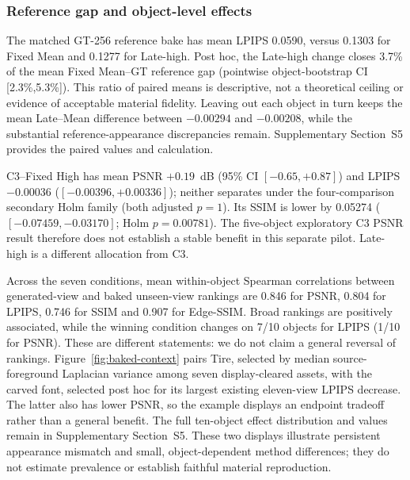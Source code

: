 \documentclass[times,twocolumn,final]{elsarticle}
\begin{document}
\subsubsection{Reference gap and object-level effects}
The matched GT-256 reference bake has mean LPIPS 0.0590, versus 0.1303 for Fixed Mean and 0.1277 for Late-high. Post hoc, the Late-high change closes 3.7\% of the mean Fixed Mean--GT reference gap (pointwise object-bootstrap CI [2.3\%,5.3\%]). This ratio of paired means is descriptive, not a theoretical ceiling or evidence of acceptable material fidelity. Leaving out each object in turn keeps the mean Late--Mean difference between $-0.00294$ and $-0.00208$, while the substantial reference-appearance discrepancies remain. Supplementary Section~S5 provides the paired values and calculation.

C3--Fixed High has mean PSNR $+0.19$~dB (95\% CI $[-0.65,+0.87]$) and LPIPS $-0.00036$ ($[-0.00396,+0.00336]$); neither separates under the four-comparison secondary Holm family (both adjusted $p=1$). Its SSIM is lower by 0.05274 ($[-0.07459,-0.03170]$; Holm $p=0.00781$). The five-object exploratory C3 PSNR result therefore does not establish a stable benefit in this separate pilot. Late-high is a different allocation from C3.

Across the seven conditions, mean within-object Spearman correlations between generated-view and baked unseen-view rankings are 0.846 for PSNR, 0.804 for LPIPS, 0.746 for SSIM and 0.907 for Edge-SSIM. Broad rankings are positively associated, while the winning condition changes on 7/10 objects for LPIPS (1/10 for PSNR). These are different statements: we do not claim a general reversal of rankings. Figure~\ref{fig:baked-context} pairs Tire, selected by median source-foreground Laplacian variance among seven display-cleared assets, with the carved font, selected post hoc for its largest existing eleven-view LPIPS decrease. The latter also has lower PSNR, so the example displays an endpoint tradeoff rather than a general benefit. The full ten-object effect distribution and values remain in Supplementary Section~S5. These two displays illustrate persistent appearance mismatch and small, object-dependent method differences; they do not estimate prevalence or establish faithful material reproduction.
\end{document}
